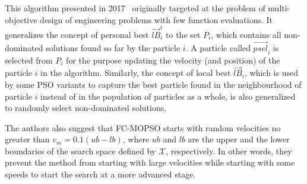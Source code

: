 This algorithm presented in 2017~\cite{mokarram2018new} originally targeted at the problem of multi-objective design of engineering problems with few function evaluations.
It generalizes the concept of personal best $\vec{lB}_i^t$ to the set $P_i$, which contains all non-dominated solutions found so far by the particle $i$. A particle called $\vec{psel}_i$ is selected from $P_i$ for the purpose updating the velocity (and position) of the particle $i$ in the algorithm. Similarly, the concept of local best $\vec{lB}_i$, which is used by some PSO variants to capture the best particle found in the neighbourhood of particle $i$ instead of in the population of particles as a whole, is also generalized to randomly select non-dominated solutions. 

The authors also suggest that FC-MOPSO starts with random velocities no greater than $v_{m} = 0.1(ub - lb)$, where $ub$ and $lb$ are the upper and the lower boundaries of the search space defined by $\mathcal{X}$, respectively. In other words, they prevent the method from starting with large velocities while starting with some speeds to start the search at a more advanced stage. 



    
    
    
		
		
		
				
		
